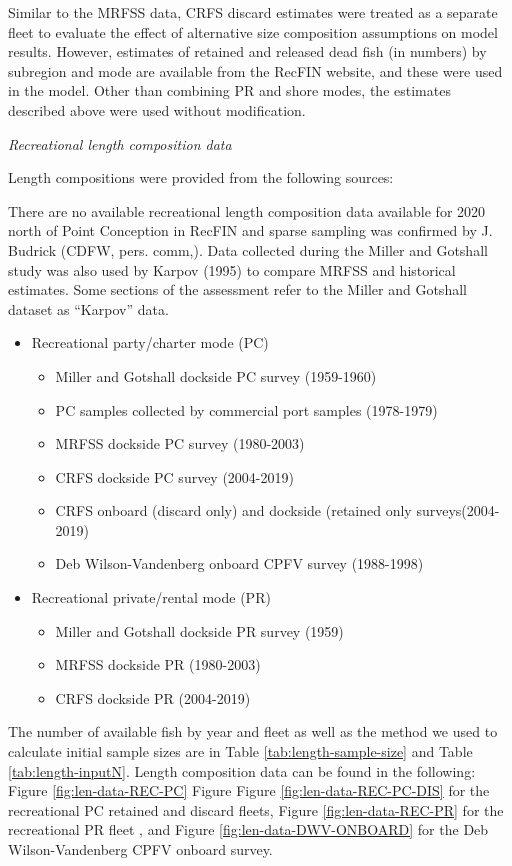 \documentclass[
  english,
  a4paper,
]{article}
\begin{document}
Similar to the MRFSS data, CRFS discard estimates were treated as a separate fleet to evaluate the effect of alternative size composition assumptions on model results. However, estimates of retained and released dead fish (in numbers) by subregion and mode are available from the RecFIN website, and these were used in the model. Other than combining PR and shore modes, the estimates described above were used without modification.

\emph{Recreational length composition data}

Length compositions were provided from the following sources:

There are no available recreational length composition data available for 2020 north
of Point Conception in RecFIN and sparse sampling was confirmed by J. Budrick (CDFW, pers. comm,).
Data collected during the Miller and Gotshall study was also used by Karpov (1995) to compare MRFSS and historical estimates. Some sections of the assessment refer to the Miller and Gotshall dataset as ``Karpov'' data.

\begin{itemize}
  \item Recreational party/charter mode (PC)
   \begin{itemize}
     \item Miller and Gotshall dockside PC survey (1959-1960) 
     \item PC samples collected by commercial port samples (1978-1979)
     \item MRFSS dockside PC survey (1980-2003)    
     \item CRFS dockside PC survey (2004-2019)
     \item CRFS onboard (discard only) and dockside (retained only surveys(2004-2019)
     \item Deb Wilson-Vandenberg onboard CPFV survey (1988-1998)
   \end{itemize}
  \item Recreational private/rental mode (PR)
   \begin{itemize}
     \item Miller and Gotshall dockside PR survey (1959) 
     \item MRFSS dockside PR (1980-2003)
     \item CRFS dockside PR (2004-2019)
  \end{itemize}
\end{itemize}

The number of available fish by year and fleet as well as the method we used to
calculate initial sample sizes are in Table \ref{tab:length-sample-size} and Table \ref{tab:length-inputN}.
Length composition data can be found in the following: Figure
\ref{fig:len-data-REC-PC} Figure Figure \ref{fig:len-data-REC-PC-DIS} for
the recreational PC retained and discard fleets,
Figure \ref{fig:len-data-REC-PR} for the recreational PR fleet
, and Figure \ref{fig:len-data-DWV-ONBOARD} for the Deb Wilson-Vandenberg CPFV onboard survey.
\end{document}
